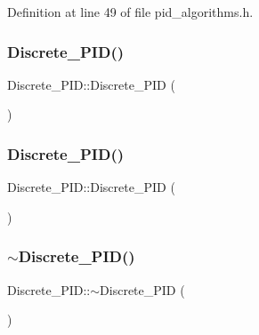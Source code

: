 Definition at line 49 of file pid\+\_\+algorithms.\+h.

\mbox{\label{class_discrete___p_i_d_ab99d18b0bebf81ea27ca4fe2c9b0f3d6}} 
\subsubsection{\texorpdfstring{Discrete\_PID()}{Discrete\_PID()}\hspace{0.1cm}{\footnotesize\ttfamily [3/4]}}
{\footnotesize\ttfamily Discrete\+\_\+\+P\+I\+D\+::\+Discrete\+\_\+\+P\+ID (\begin{DoxyParamCaption}\item[{\mbox{\hyperlink{class_discrete___p_i_d}{Discrete\+\_\+\+P\+ID}} \&\&}]{ }\end{DoxyParamCaption})\hspace{0.3cm}{\ttfamily [default]}}

\mbox{\label{class_discrete___p_i_d_aaedf8e36ddb10c9998ff8edbca5ec42b}} 
\subsubsection{\texorpdfstring{Discrete\_PID()}{Discrete\_PID()}\hspace{0.1cm}{\footnotesize\ttfamily [4/4]}}
{\footnotesize\ttfamily Discrete\+\_\+\+P\+I\+D\+::\+Discrete\+\_\+\+P\+ID (\begin{DoxyParamCaption}\item[{const \mbox{\hyperlink{class_discrete___p_i_d}{Discrete\+\_\+\+P\+ID}} \&}]{ }\end{DoxyParamCaption})\hspace{0.3cm}{\ttfamily [default]}}

\mbox{\label{class_discrete___p_i_d_a87f9e2fc9b853704494941c92670a039}} 
\subsubsection{\texorpdfstring{$\sim$Discrete\_PID()}{~Discrete\_PID()}}
{\footnotesize\ttfamily Discrete\+\_\+\+P\+I\+D\+::$\sim$\+Discrete\+\_\+\+P\+ID (\begin{DoxyParamCaption}{ }\end{DoxyParamCaption})\hspace{0.3cm}{\ttfamily [inline]}}



